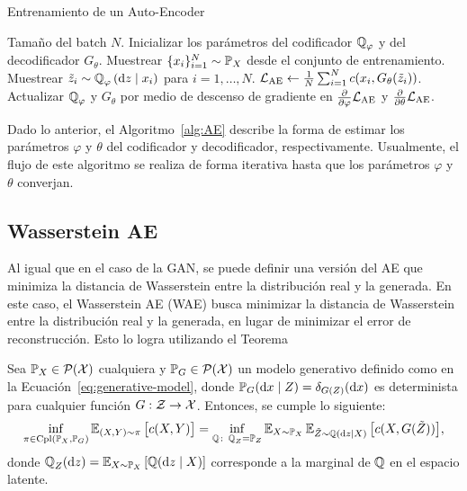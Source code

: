 \begin{algorithm}[th!]
	\caption{Entrenamiento de un Auto-Encoder}\label{alg:AE}
	\begin{algorithmic}[1]
		\Require Tamaño del batch $N$.
		\State Inicializar los parámetros del codificador $\ProbQ_\varphi$ y del decodificador $G_\theta$.
		\State Muestrear $\{x_i\}_{i=1}^{N} \sim \Prob_X$ desde el conjunto de entrenamiento.
		\State Muestrear $\tilde z_i \sim \ProbQ_\varphi \left( \dd z \mid x_i \right)$ para $i=1,\ldots,N$.
		\State $\mathcal{L}_{\mathrm{AE}}\gets \frac{1}{N}\sum_{i=1}^{N} c(x_i, G_\theta(\tilde z_i))$.
		\State Actualizar $\ProbQ_\varphi$ y $G_\theta$ por medio de descenso de gradiente en $\pdv{\varphi} \cL_{\mathrm{AE}}$ y $\pdv{\theta} \mathcal{L}_{\mathrm{AE}}$.
		\EndWhile
	\end{algorithmic}

\end{algorithm}

Dado lo anterior, el Algoritmo~\ref{alg:AE} describe la forma de estimar los parámetros $\varphi$ y $\theta$ del codificador y decodificador, respectivamente. Usualmente, el flujo de este algoritmo se realiza de forma iterativa hasta que los parámetros $\varphi$ y $\theta$ converjan.


\subsection{Wasserstein AE}\label{ssec:WAE}  %

Al igual que en el caso de la GAN, se puede definir una versión del AE que minimiza la distancia de Wasserstein entre la distribución real y la generada. En este caso, el Wasserstein AE (WAE) \cite{tolstikhin2017wasserstein} busca minimizar la distancia de Wasserstein entre la distribución real y la generada, en lugar de minimizar el error de reconstrucción. Esto lo logra utilizando el Teorema

\begin{theorem}
	Sea $\Prob_X\in \ProbSpace$ cualquiera y  $\Prob_G\in \ProbSpace$ un modelo generativo definido como en la Ecuación~\eqref{eq:generative-model}, donde $\Prob_G(\dd x \mid Z) = \delta_{G(Z)}(\dd x)$ es determinista para cualquier función $G:\mathcal{Z} \to \mathcal{X}$. Entonces, se cumple lo siguiente:
	\begin{equation}
		\inf_{\pi\in\Cpl(\Prob_X, \Prob_G)} \Exp_{(X, Y)\sim\pi} \qty\big[ c(X, Y) ] = \inf_{\ProbQ \colon \ProbQ_Z = \Prob_Z} \Exp_{X\sim\Prob_X} \Exp_{\tilde Z\sim\ProbQ(\dd z \mid X)} \qty\big[ c(X, G(\tilde Z)) ],
	\end{equation}
	donde $\ProbQ_Z(\dd z) = \Exp_{X\sim \Prob_X} \qty[\ProbQ(\dd z \mid X)]$ corresponde a la marginal de $\ProbQ$ en el espacio latente.
\end{theorem}

